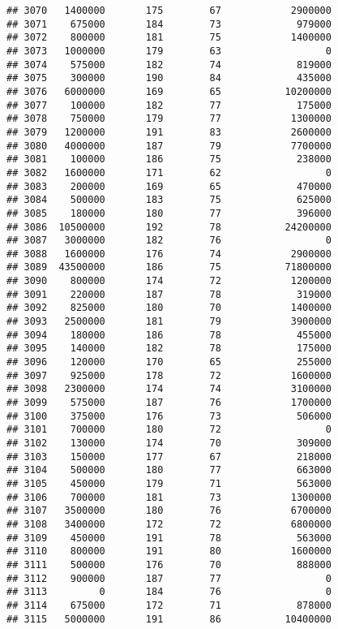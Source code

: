 \documentclass[
]{article}
\begin{document}
\begin{verbatim}
## 3070   1400000       175        67            2900000
## 3071    675000       184        73             979000
## 3072    800000       181        75            1400000
## 3073   1000000       179        63                  0
## 3074    575000       182        74             819000
## 3075    300000       190        84             435000
## 3076   6000000       169        65           10200000
## 3077    100000       182        77             175000
## 3078    750000       179        77            1300000
## 3079   1200000       191        83            2600000
## 3080   4000000       187        79            7700000
## 3081    100000       186        75             238000
## 3082   1600000       171        62                  0
## 3083    200000       169        65             470000
## 3084    500000       183        75             625000
## 3085    180000       180        77             396000
## 3086  10500000       192        78           24200000
## 3087   3000000       182        76                  0
## 3088   1600000       176        74            2900000
## 3089  43500000       186        75           71800000
## 3090    800000       174        72            1200000
## 3091    220000       187        78             319000
## 3092    825000       180        70            1400000
## 3093   2500000       181        79            3900000
## 3094    180000       186        78             455000
## 3095    140000       182        78             175000
## 3096    120000       170        65             255000
## 3097    925000       178        72            1600000
## 3098   2300000       174        74            3100000
## 3099    575000       187        76            1700000
## 3100    375000       176        73             506000
## 3101    700000       180        72                  0
## 3102    130000       174        70             309000
## 3103    150000       177        67             218000
## 3104    500000       180        77             663000
## 3105    450000       179        71             563000
## 3106    700000       181        73            1300000
## 3107   3500000       180        76            6700000
## 3108   3400000       172        72            6800000
## 3109    450000       191        78             563000
## 3110    800000       191        80            1600000
## 3111    500000       176        70             888000
## 3112    900000       187        77                  0
## 3113         0       184        76                  0
## 3114    675000       172        71             878000
## 3115   5000000       191        86           10400000

\end{verbatim}
\end{document}
